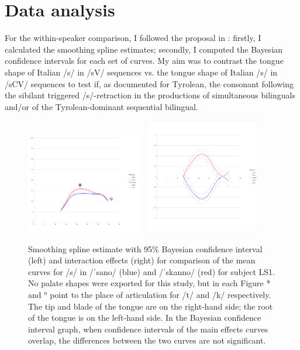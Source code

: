 \documentclass[output=paper]{LSP/langsci}
\begin{document}
\section{Data analysis}
For the within-speaker comparison, I followed the proposal in \citet{davidson_comparing_2006}: firstly, I calculated the smoothing spline estimates; secondly, I computed the Bayesian confidence intervals for each set of curves. My aim was to contrast the tongue shape of Italian /s/ in /sV/ sequences vs. the tongue shape of Italian /s/ in /sCV/ sequences to test if, as documented for Tyrolean, the consonant following the sibilant triggered /s/-retraction in the productions of simultaneous bilinguals and/or of the Tyrolean-dominant sequential bilingual.


\begin{figure}[p]
\includegraphics[width=0.45\textwidth]{illustrations/sprea_fig1a}~
\includegraphics[width=0.45\textwidth,trim=4 32 4 12,clip]{illustrations/sprea_fig1b}
\caption{Smoothing spline estimate with 95\% Bayesian confidence interval (left) and interaction effects (right) for comparison of the mean curves for /s/ in /ˈsano/ (blue) and /ˈskanno/ (red) for subject LS1. No palate shapes were exported for this study, but in each Figure * and ° point to the place of articulation for /t/ and /k/ respectively. The tip and blade of the tongue are on the right-hand side; the root of the tongue is on the left-hand side. In the Bayesian confidence interval graph, when confidence intervals of the main effects curves overlap, the differences between the two curves are not significant.} 
\label{fig:1}   
\end{figure}
\end{document}
